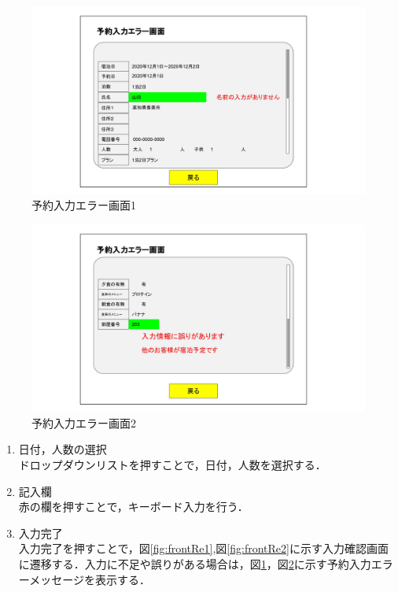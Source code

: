 \begin{figure}[H]
 \centering
   \includegraphics[width=150mm]{UI_front/reseE1.jpg}
 \caption{予約入力エラー画面1}
 \label{fig:frontRE1}
\end{figure}
\begin{figure}[H]
 \centering
   \includegraphics[width=150mm]{UI_front/reseE2.jpg}
 \caption{予約入力エラー画面2}
 \label{fig:frontRE2}
\end{figure}


\begin{enumerate}
\renewcommand{\labelenumi}{\textcircled{\scriptsize \theenumi}}
\item 日付，人数の選択\\ ドロップダウンリストを押すことで，日付，人数を選択する．
\item 記入欄\\ 赤の欄を押すことで，キーボード入力を行う．
\item 入力完了\\ 入力完了を押すことで，図\ref{fig:frontRe1},図\ref{fig:frontRe2}に示す入力確認画面に遷移する．入力に不足や誤りがある場合は，図\ref{fig:frontRE1}，図\ref{fig:frontRE2}に示す予約入力エラーメッセージを表示する．
\end{enumerate}


